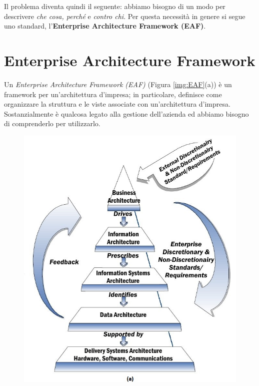 Il problema diventa quindi il seguente: abbiamo bisogno di un modo per descrivere \textit{che cosa, perché} e \textit{contro chi}. Per questa necessità in genere si segue uno standard, l'\textbf{Enterprise Architecture Framework (EAF)}.

\section{Enterprise Architecture Framework}
Un \textit{Enterprise Architecture Framework (EAF)} (Figura \ref{img:EAF}(a)) è un framework per un'architettura d'impresa; in particolare, definisce come organizzare la struttura e le viste associate con un'architettura d'impresa. Sostanzialmente è qualcosa legato alla gestione dell'azienda ed abbiamo bisogno di comprenderlo per utilizzarlo.
\begin{figure}[htbp]
	\centering
	\includegraphics[scale = 0.4]{images/EAF_scheme.jpg}\qquad\qquad

\end{figure}
